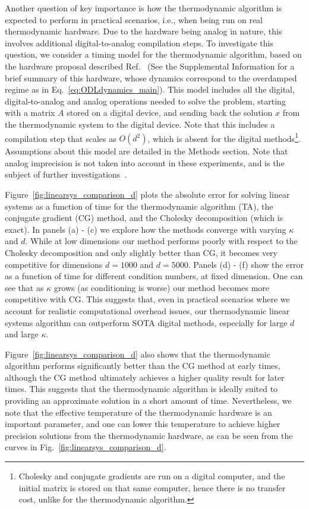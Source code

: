 \documentclass[prx,onecolumn,floatfix,longbibliography,notitlepage, nofootinbib]{revtex4-1}
\begin{document}
Another question of key importance is how the thermodynamic algorithm is expected to perform in practical scenarios, i.e., when being run on real thermodynamic hardware. Due to the hardware being analog in nature, this involves additional digital-to-analog compilation steps. To investigate this question, we consider a timing model for the thermodynamic algorithm, based on the hardware proposal described  Ref.~\cite{coles2023thermodynamic} (See the Supplemental Information for a brief summary of this hardware, whose dynamics correspond to the overdamped regime as in Eq.~\eqref{eq:ODLdynamics_main}). This model includes all the digital, digital-to-analog and analog operations needed to solve the problem, starting with a matrix $A$ stored on a digital device, and sending back the solution $x$ from the thermodynamic system to the digital device. Note that this includes a compilation step that scales as $O(d^2)$, which is absent for the digital methods\footnote{Cholesky and conjugate gradients are run on a digital computer, and the initial matrix is stored on that same computer, hence there is no transfer cost, unlike for the thermodynamic algorithm.}. Assumptions about this model are detailed in the Methods section. Note that analog imprecision is not taken into account in these experiments, and is the subject of further investigations~\cite{aifer2024error}.

Figure~\ref{fig:linearsys_comparison_d} plots the absolute error for solving linear systems as a function of time for the thermodynamic algorithm (TA), the conjugate gradient (CG) method, and the Cholesky decomposition (which is exact). In panels (a) - (c) we explore how the methods converge with varying $\kappa$ and $d$. While at low dimensions our method performs poorly with respect to the Cholesky decomposition and only slightly better than CG, it  becomes very competitive for dimensions $d = 1000$ and $d=5000$. Panels (d) - (f) show the error as a function of time for different condition numbers, at fixed dimension. One can see that as $\kappa$ grows (as conditioning is worse) our method becomes more competitive with CG. This suggests that, even in practical scenarios where we account for realistic computational overhead issues, our thermodynamic linear systems algorithm can outperform SOTA digital methods, especially for large $d$ and large $\kappa$.

Figure~\ref{fig:linearsys_comparison_d} also shows that the thermodynamic algorithm performs significantly better than the CG method at early times, although the CG method ultimately achieves a higher quality result for later times. This suggests that the thermodynamic algorithm is ideally suited to providing an approximate solution in a short amount of time. Nevertheless, we note that the effective temperature of the thermodynamic hardware is an important parameter, and one can lower this temperature to achieve higher precision solutions from the thermodynamic hardware, as can be seen from the curves in Fig.~\ref{fig:linearsys_comparison_d}.
\end{document}
